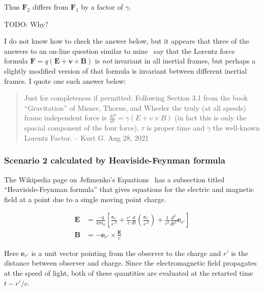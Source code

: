 \documentclass[a4paper]{article}
\theoremstyle{plain}
\theoremstyle{definition}
\newcommand{\vect}[1]{\textbf{#1}}
\begin{document}
Thus $\vect{F}_2$ differs from $\vect{F}_1$ by a factor of $\gamma$.

TODO: Why?

I do not know how to check the answer below, but it appears that three
of the answers to an on-line question similar to
mine~\cite{PhysicsSEIsLorentzForceFrameIndependent} say that the
Lorentz force formula $\vect{F} = q(\vect{E} + \vect{v} \times
\vect{B})$ is {\em not} invariant in all inertial frames, but perhaps
a slightly modified version of that formula is invariant between
different inertial frames.  I quote one such answer below:

\begin{quote}
Just for completeness if permitted: Following Section 3.1 from the
book ``Gravitation'' of Misner, Thorne, and Wheeler the truly (at all
speeds) frame independent force is $\frac{dP}{d \tau} = \gamma (E + v
\times B)$ (in fact this is only the spacial component of the four
force).  $\tau$ is proper time and $\gamma$ the well-known Lorentz
Factor. -- Kurt G. Aug 28, 2021
\end{quote}


\subsubsection{Scenario 2 calculated by Heaviside-Feynman formula}

The Wikipedia page on Jefimenko's Equations~\cite{JefimenkosEquations}
has a subsection titled ``Heaviside-Feynman formula'' that gives
equations for the electric and magnetic field at a point due to a
single moving point charge.

\begin{align}
\vect{E} & = \frac{-q}{4 \pi \epsilon_0}
             \left[
               \frac{\vect{e}_{r'}}{r'^2}
               + \frac{r'}{c} \frac{d}{dt} \left( \frac{\vect{e}_{r'}}{r'^2} \right)
               + \frac{1}{c^2} \frac{d^2}{dt^2} \vect{e}_{r'}
             \right]
             \label{eq:HF-EforPtChg} \\
\vect{B} & = - \vect{e}_{r'} \times \frac{\vect{E}}{c}
             \label{eq:HF-BforPtChg}
\end{align}

Here $\vect{e}_{r'}$ is a unit vector pointing from the observer to
the charge and $r'$ is the distance between observer and charge.
Since the electromagnetic field propagates at the speed of light, both
of these quantities are evaluated at the retarted time $t - r'/c$.
\end{document}
